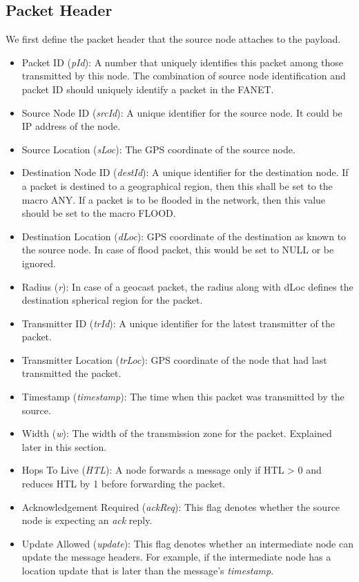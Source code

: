 \subsection{Packet Header} \label{packet_header}
We first define the packet header that the source node attaches to the payload.
\begin{itemize}
\item Packet ID (\emph{pId}): A number that uniquely identifies this packet among those transmitted by this node. The combination of source node identification and packet ID should uniquely identify a packet in the FANET. 
\item Source Node ID (\emph{srcId}): A unique identifier for the source node. It could be IP address of the node.
\item Source Location (\emph{sLoc}): The GPS coordinate of the source node.
\item Destination Node ID (\emph{destId}): A unique identifier for the destination node. If a packet is destined to a geographical region, then this shall be set to the macro ANY. If a packet is to be flooded in the network, then this value should be set to the macro FLOOD. 
\item Destination Location (\emph{dLoc}): GPS coordinate of the destination as known to the source node. In case of flood packet, this would be set to NULL or be ignored. 
\item Radius (\emph{r}): In case of a geocast packet, the radius along with dLoc defines the destination spherical region for the packet.
\item Transmitter ID (\emph{trId}): A unique identifier for the latest transmitter of the packet.
\item Transmitter Location (\emph{trLoc}): GPS coordinate of the node that had last transmitted the packet.
\item Timestamp (\emph{timestamp}): The time when this packet was transmitted by the source.
\item Width (\emph{w}): The width of the transmission zone for the packet. Explained later in this section.
\item Hops To Live (\emph{HTL}): A node forwards a message only if HTL > 0 and reduces HTL by 1 before forwarding the packet. 
\item Acknowledgement Required (\emph{ackReq}): This flag denotes whether the source node is expecting an \emph{ack} reply.
\item Update Allowed (\emph{update}): This flag denotes whether an intermediate node can update the message headers. For example, if the intermediate node has a location update that is later than the message's \emph{timestamp}.

\end{itemize}

